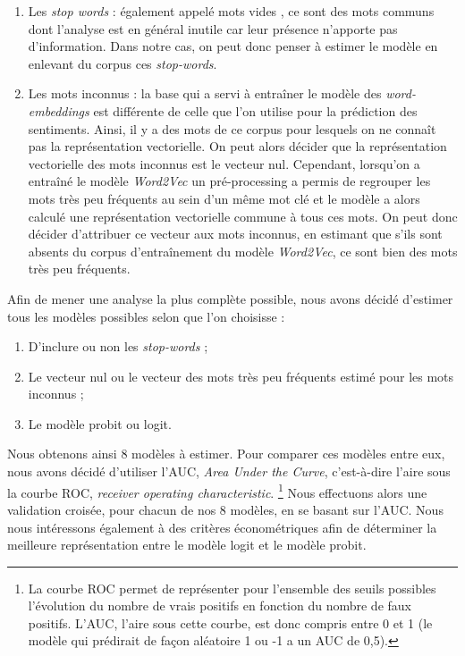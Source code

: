 \documentclass[11pt,french,french]{article}
\let\rmarkdownfootnote\footnote%
\def\footnote{\protect\rmarkdownfootnote}
\begin{document}
\begin{enumerate}
\def\labelenumi{\arabic{enumi}.}
\item
  Les \emph{stop words} : également appelé \og mots vides \fg, ce sont
  des mots communs dont l'analyse est en général inutile car leur
  présence n'apporte pas d'information. Dans notre cas, on peut donc
  penser à estimer le modèle en enlevant du corpus ces
  \emph{stop-words}.
\item
  Les mots inconnus : la base qui a servi à entraîner le modèle des
  \emph{word-embeddings} est différente de celle que l'on utilise pour
  la prédiction des sentiments. Ainsi, il y a des mots de ce corpus pour
  lesquels on ne connaît pas la représentation vectorielle. On peut
  alors décider que la représentation vectorielle des mots inconnus est
  le vecteur nul. Cependant, lorsqu'on a entraîné le modèle
  \emph{Word2Vec} un pré-processing a permis de regrouper les mots très
  peu fréquents au sein d'un même mot clé et le modèle a alors calculé
  une représentation vectorielle commune à tous ces mots. On peut donc
  décider d'attribuer ce vecteur aux mots inconnus, en estimant que
  s'ils sont absents du corpus d'entraînement du modèle \emph{Word2Vec},
  ce sont bien des mots très peu fréquents.
\end{enumerate}

Afin de mener une analyse la plus complète possible, nous avons décidé
d'estimer tous les modèles possibles selon que l'on choisisse :

\begin{enumerate}
\def\labelenumi{\arabic{enumi}.}
\item
  D'inclure ou non les \emph{stop-words} ;
\item
  Le vecteur nul ou le vecteur des mots très peu fréquents estimé pour
  les mots inconnus ;
\item
  Le modèle probit ou logit.
\end{enumerate}

Nous obtenons ainsi 8 modèles à estimer. Pour comparer ces modèles entre
eux, nous avons décidé d'utiliser l'AUC, \emph{Area Under the Curve},
c'est-à-dire l'aire sous la courbe ROC, \emph{receiver operating
characteristic}. \footnote{La courbe ROC permet de représenter pour
  l'ensemble des seuils possibles l'évolution du nombre de vrais
  positifs en fonction du nombre de faux positifs. L'AUC, l'aire sous
  cette courbe, est donc compris entre 0 et 1 (le modèle qui prédirait
  de façon aléatoire 1 ou -1 a un AUC de 0,5).} Nous effectuons alors
une validation croisée, pour chacun de nos 8 modèles, en se basant sur
l'AUC. Nous nous intéressons également à des critères économétriques
afin de déterminer la meilleure représentation entre le modèle logit et
le modèle probit.
\end{document}
